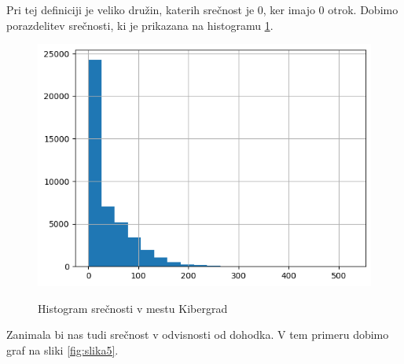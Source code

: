 \documentclass{article}
\begin{document}
Pri tej definiciji je veliko družin, katerih srečnost je 0, ker imajo 0 otrok. Dobimo porazdelitev srečnosti, ki je prikazana na histogramu \ref{fig:slika4}.

\begin{figure}[H]
    \caption{Histogram srečnosti v mestu Kibergrad}
    \centering 
    \includegraphics[scale=0.8]{histogram_srecnosti.png}
    \label{fig:slika4}
\end{figure}

Zanimala bi nas tudi srečnost v odvisnosti od dohodka. V tem primeru dobimo graf na sliki \ref{fig:slika5}.
\end{document}
